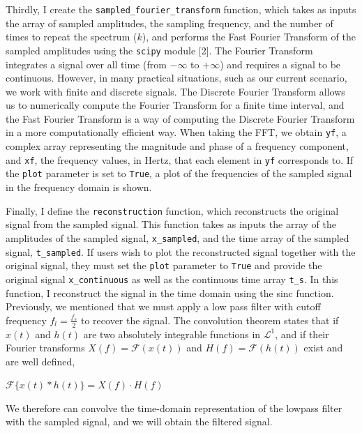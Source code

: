 \documentclass{article}
\begin{document}
Thirdly, I create the \verb|sampled_fourier_transform| function, which takes as inputs the array of sampled amplitudes, the sampling frequency, and the number of times to repeat the spectrum ($k$), 
and performs the Fast Fourier Transform of the sampled amplitudes using the \verb|scipy| module [2].
The Fourier Transform integrates a signal over all time (from $-\infty$ to $+\infty$) and requires a signal to be continuous. 
However, in many practical situations, such as our current scenario, we work with finite and discrete signals. 
The Discrete Fourier Transform allows us to numerically compute the Fourier Transform for a finite time interval, 
and the Fast Fourier Transform is a way of computing the Discrete Fourier Transform in a more computationally efficient way. 
When taking the FFT, we obtain \verb|yf|, a complex array representing the magnitude and phase of a frequency component, 
and \verb|xf|, the frequency values, in Hertz, that each element in \verb|yf| corresponds to. 
If the \verb|plot| parameter is set to \verb|True|, a plot of the frequencies of the sampled signal in the frequency domain is shown.

Finally, I define the \verb|reconstruction| function, which reconstructs the original signal from the sampled signal.
This function takes as inputs the array of the amplitudes of the sampled signal, \verb|x_sampled|, and the time array of the sampled signal, \verb|t_sampled|.
If users wish to plot the reconstructed signal together with the original signal, they must set the \verb|plot| parameter to \verb|True| and provide the original signal \verb|x_continuous| as well as the continuous time array \verb|t_s|.
In this function, I reconstruct the signal in the time domain using the sinc function.
Previously, we mentioned that we must apply a low pass filter with cutoff frequency $f_l = \frac{f_s}{2}$ to recover the signal.
The convolution theorem states that if $x(t)$ and $h(t)$ are two absolutely integrable functions in $\mathcal{L}^1$, and if their Fourier transforms $X(f) = \mathcal{F}(x(t))$ and $H(f) = \mathcal{F}(h(t))$ exist and are well defined,
\begin{center}
    \begin{math}
       \displaystyle \mathcal{F}\{ x(t) * h(t) \} = X(f) \cdot H(f)
    \end{math}
\end{center}
We therefore can convolve the time-domain representation of the lowpass filter with the sampled signal, and we will obtain the filtered signal.
\end{document}
